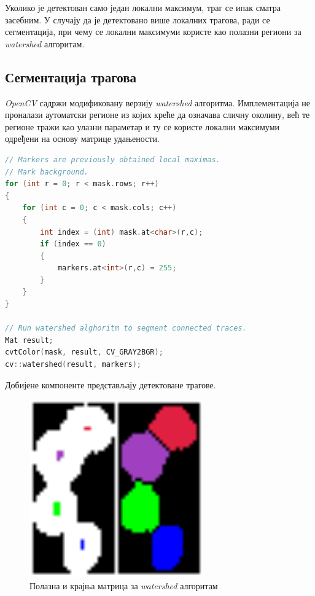 \documentclass[12pt,a4paper,serbian,oneside]{book}
\begin{document}
Уколико је детектован само један локални максимум, траг се ипак сматра засебним. У случају да је детектовано више локалних трагова, ради се сегментација, при чему се  локални максимуми користе као полазни региони за \textit{watershed} алгоритам.

\subsection{Сегментација трагова}

\textit{OpenCV} садржи модификовану верзију \textit{watershed} алгоритма. Имплементација не проналази аутоматски регионе из којих креће да означава сличну околину, већ те регионе тражи као улазни параметар и ту се користе локални максимуми одређени на основу матрице удањености.

 \begin{lstlisting}[language=C++,label=lst:grayscaleOtsu,caption=Сегментација трагова]
// Markers are previously obtained local maximas.
// Mark background.
for (int r = 0; r < mask.rows; r++)
{
    for (int c = 0; c < mask.cols; c++)
    {
        int index = (int) mask.at<char>(r,c);
        if (index == 0)
        {
            markers.at<int>(r,c) = 255;
        }
    }
}

// Run watershed alghoritm to segment connected traces.
Mat result;
cvtColor(mask, result, CV_GRAY2BGR);
cv::watershed(result, markers);
\end{lstlisting}

Добијене компоненте представљају детектоване трагове.

\begin{figure}[htb]
\begin{center}
\includegraphics[width=75mm]{images/watershed.png}
\end{center}
\caption{Полазна и крајња матрица за \textit{watershed} алгоритам}
\label{fig:result}
\end{figure}
\end{document}
